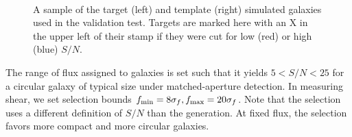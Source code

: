 \documentclass[11pt,preprint,flushrt]{aastex}
\begin{document}
\begin{figure}[ht]
\centering
\mbox{\quad
{}}

\caption{ A sample of the target (left) and template (right) simulated
  galaxies used in the validation test. Targets are marked here with
  an X in the upper left of their stamp if they were cut for low (red)
  or high (blue) $S/N$.  } 
\label{galsim_images}
\end{figure}
 
The range of flux assigned to galaxies is set such that it yields
$5<S/N<25$ for a circular galaxy of typical size under
matched-aperture detection.   In measuring shear, we
set selection bounds $f_{\rm min}=8\sigma_f, f_{\rm max}=20\sigma_f$.
Note that the selection uses a different definition of $S/N$ than the
generation.  At fixed flux, the selection favors more compact and more
circular galaxies.
\end{document}
